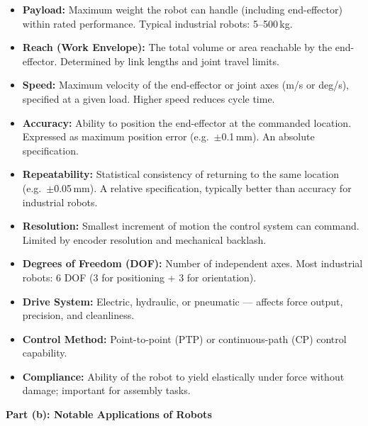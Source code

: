 \documentclass[12pt,a3paper]{article}
\begin{document}
\begin{enumerate}
\begin{tcolorbox}[enhanced,breakable,ansbox,colback=cA!4,colframe=cA,
  boxrule=0.8pt,arc=5pt,
  title={\textbf{Answer}},fonttitle=\bfseries\color{white},colbacktitle=cA]
\begin{itemize}[leftmargin=1.5em,itemsep=3pt]
  \item \textbf{Payload:} Maximum weight the robot can handle (including
        end-effector) within rated performance. Typical industrial robots:
        5--500\,kg.
  \item \textbf{Reach (Work Envelope):} The total volume or area reachable
        by the end-effector. Determined by link lengths and joint travel
        limits.
  \item \textbf{Speed:} Maximum velocity of the end-effector or joint axes
        (m/s or deg/s), specified at a given load. Higher speed reduces
        cycle time.
  \item \textbf{Accuracy:} Ability to position the end-effector at the
        commanded location. Expressed as maximum position error (e.g.\
        $\pm$0.1\,mm). An absolute specification.
  \item \textbf{Repeatability:} Statistical consistency of returning to
        the same location (e.g.\ $\pm$0.05\,mm). A relative specification,
        typically better than accuracy for industrial robots.
  \item \textbf{Resolution:} Smallest increment of motion the control
        system can command. Limited by encoder resolution and mechanical
        backlash.
  \item \textbf{Degrees of Freedom (DOF):} Number of independent axes.
        Most industrial robots: 6 DOF (3 for positioning + 3 for orientation).
  \item \textbf{Drive System:} Electric, hydraulic, or pneumatic — affects
        force output, precision, and cleanliness.
  \item \textbf{Control Method:} Point-to-point (PTP) or continuous-path
        (CP) control capability.
  \item \textbf{Compliance:} Ability of the robot to yield elastically
        under force without damage; important for assembly tasks.
\end{itemize}

\hrulefill

\textbf{Part (b): Notable Applications of Robots}


\end{tcolorbox}
\end{enumerate}
\end{document}
